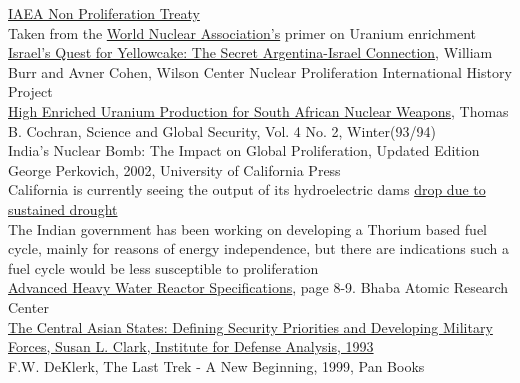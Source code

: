 \documentclass[journal]{IEEEtran}
\begin{document}
\begin{thebibliography}{1}
 \href{http://disarmament.un.org/treaties/t/npt/text}{IAEA Non Proliferation Treaty}\\

Taken from the \href{http://www.world-nuclear.org/info/nuclear-fuel-cycle/conversion-enrichment-and-fabrication/uranium-enrichment/}{World Nuclear Association's} primer on Uranium enrichment\\

 \href{http://www.wilsoncenter.org/publication/israels-quest-for-yellowcake-the-secret-argentina-israel-connection-1963-1966#_edn1}{Israel's Quest for Yellowcake: The Secret Argentina-Israel Connection}, William Burr and Avner Cohen, Wilson Center Nuclear Proliferation International History Project\\

 \href{http://docs.nrdc.org/nuclear/files/nuc_10139301a_116.pdf}{High Enriched Uranium Production for South African Nuclear Weapons}, Thomas B. Cochran, Science and Global Security, Vol. 4 No. 2, Winter(93/94)\\

India's Nuclear Bomb: The Impact on Global Proliferation, Updated Edition George Perkovich, 2002, University of California Press\\

 California is currently seeing the output of its hydroelectric dams \href{http://www.energy.ca.gov/drought/}{drop due to sustained drought}\\

 The Indian government has been working on developing a Thorium based fuel cycle, mainly for reasons of energy independence, but there are indications such a fuel cycle would be less susceptible to proliferation\\

\href{http://www.barc.gov.in/reactor/ahwr.pdf}{Advanced Heavy Water Reactor Specifications}, page 8-9. Bhaba Atomic Research Center\\

\href{http://www.dtic.mil/cgi-bin/GetTRDoc?Location=U2&doc=GetTRDoc.pdf&AD=ADA275270}{The Central Asian States: Defining Security Priorities and Developing Military Forces, Susan L. Clark, Institute for Defense Analysis, 1993}\\

 F.W. DeKlerk, The Last Trek - A New Beginning, 1999, Pan Books\\


\end{thebibliography}
\end{document}
